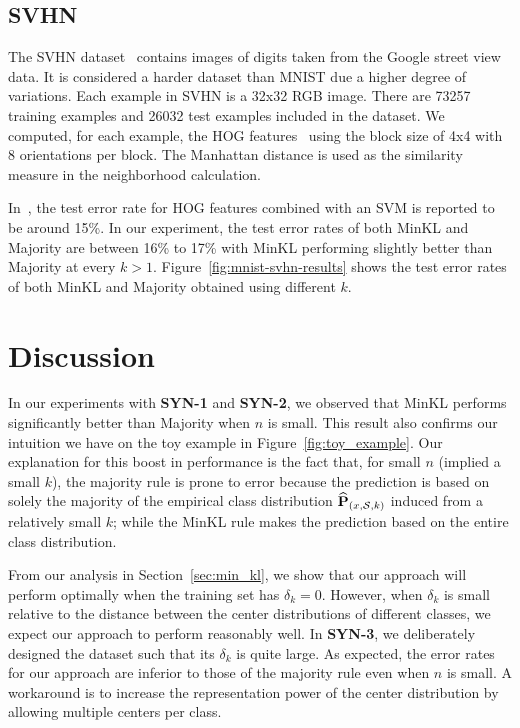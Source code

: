 \documentclass{article}
\begin{document}
\subsection{SVHN}
The SVHN dataset~\cite{Netzer2011} contains images of digits taken
from the Google street view data. It is considered a harder dataset
than MNIST due a higher degree of variations. Each example in SVHN is
a 32x32 RGB image. There are 73257 training examples and 26032 test
examples included in the dataset. We computed, for each example, the
HOG features~\cite{Dalal2005} using the block size of 4x4 with 8
orientations per block. The Manhattan distance is used as the
similarity measure in the neighborhood calculation.

In~\cite{Netzer2011}, the test error rate for HOG features combined
with an SVM is reported to be around 15\%. In our experiment, the test
error rates of both MinKL and Majority are between 16\% to 17\% with
MinKL performing slightly better than Majority at every $k >
1$. Figure~\ref{fig:mnist-svhn-results} shows the test error rates of
both MinKL and Majority obtained using different $k$.

\section{Discussion}
\label{sec:discussion}

In our experiments with \textbf{SYN-1} and \textbf{SYN-2}, we observed
that MinKL performs significantly better than Majority when $n$ is
small. This result also confirms our intuition we have on the toy
example in Figure~\ref{fig:toy_example}. Our explanation for this
boost in performance is the fact that, for small $n$ (implied a small
$k$), the majority rule is prone to error because the prediction is
based on solely the majority of the empirical class distribution
$\widehat{\mathbf{P}}_{(x,\mathcal{S},k)}$ induced from a relatively small $k$; while the MinKL
rule makes the prediction based on the entire class distribution.

From our analysis in Section~\ref{sec:min_kl}, we show that our
approach will perform optimally when the training set has $\delta_k =
0$. However, when $\delta_k$ is small relative to the distance between
the center distributions of different classes, we expect our approach
to perform reasonably well. In \textbf{SYN-3}, we deliberately
designed the dataset such that its $\delta_k$ is quite large. As
expected, the error rates for our approach are inferior to those of
the majority rule even when $n$ is small. A workaround is to increase
the representation power of the center distribution by allowing
multiple centers per class.
\end{document}
